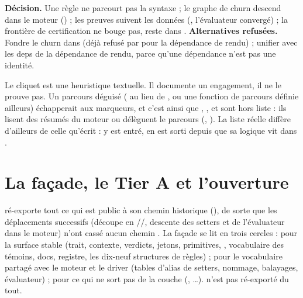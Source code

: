 \begin{decision}
\textbf{Décision.} Une règle ne parcourt pas la syntaxe ; le graphe de churn descend dans le moteur () ; les preuves suivent les données (, l'évaluateur convergé) ; la frontière de certification ne bouge pas,  reste dans .
\textbf{Alternatives refusées.} Fondre le churn dans  (déjà refusé par  pour la dépendance de rendu) ; unifier  avec les deps de la dépendance de rendu, parce qu'une dépendance n'est pas une identité.
\end{decision}

\begin{piege}
Le cliquet est une heuristique textuelle. Il documente un engagement, il ne le prouve pas. Un parcours déguisé ( au lieu de , ou une fonction de parcours définie ailleurs) échapperait aux marqueurs, et c'est ainsi que , ,  et  sont hors liste : ils lisent des résumés du moteur ou délèguent le parcours (, ). La liste réelle diffère d'ailleurs de celle qu'écrit  :  y est entré,  en est sorti depuis que sa logique vit dans .
\end{piege}

\section{La façade, le Tier A et l'ouverture}
\label{sec:api-regles-ouverture}

 ré-exporte tout ce qui est public à son chemin historique (), de sorte que les déplacements successifs (découpe en //, descente des setters et de l'évaluateur dans le moteur) n'ont cassé aucun chemin . La façade se lit en trois cercles :  pour la surface stable (trait, contexte, verdicts, jetons, primitives, , vocabulaire des témoins, docs, registre, les dix-neuf structures de règles) ;  pour le vocabulaire partagé avec le moteur et le driver (tables d'alias de setters, nommage, balayages, évaluateur) ;  pour ce qui ne sort pas de la couche (, \ldots).  n'est pas ré-exporté du tout.


